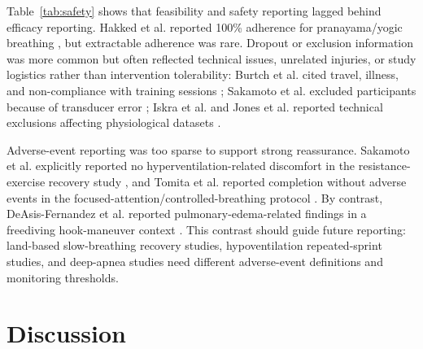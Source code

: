 \documentclass[12pt,a4paper]{article}
\begin{document}
Table~\ref{tab:safety} shows that feasibility and safety reporting lagged behind efficacy reporting. Hakked et al. reported 100\% adherence for pranayama/yogic breathing \parencite{hakked_cs_and_balakrishnan_r_and_krishnamurthy_mn_yogic_2017}, but extractable adherence was rare. Dropout or exclusion information was more common but often reflected technical issues, unrelated injuries, or study logistics rather than intervention tolerability: Burtch et al. cited travel, illness, and non-compliance with training sessions \parencite{burtch_controlled_2017}; Sakamoto et al. excluded participants because of transducer error \parencite{sakamoto_a_and_naito_h_and_chow_cm_effects_2018}; Iskra et al. and Jones et al. reported technical exclusions affecting physiological datasets \parencite{iskra_m_and_laborde_s_and_poppa_t_and_salvotti_c_and_weinand_e_and_raab_m_and_voigt_l_specifying_2026,jones_effectiveness_2026}.

Adverse-event reporting was too sparse to support strong reassurance. Sakamoto et al. explicitly reported no hyperventilation-related discomfort in the resistance-exercise recovery study \parencite{sakamoto_hyperventilation-aided_2020}, and Tomita et al. reported completion without adverse events in the focused-attention/controlled-breathing protocol \parencite{tomita_y_and_yokoo_m_and_shimoda_k_and_iizuka_t_and_sakamoto_e_and_irisawa_k_and_tozato_f_and_tsuchiya_k_focused_2026}. By contrast, DeAsis-Fernandez et al. reported pulmonary-edema-related findings in a freediving hook-maneuver context \parencite{deasis_fernandez_effects_2025}. This contrast should guide future reporting: land-based slow-breathing recovery studies, hypoventilation repeated-sprint studies, and deep-apnea studies need different adverse-event definitions and monitoring thresholds.

\section{Discussion}
\end{document}
